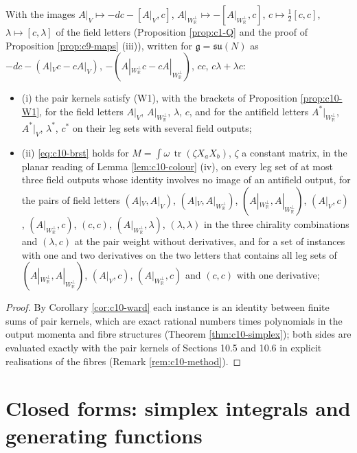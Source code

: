 \begin{proposition}
\label{prop:c10-checks}
With the images $A|_V\mapsto-dc-[A|_V,c]$, $A|_{W_{\mathbb R}^\perp}\mapsto-[A|_{W_{\mathbb R}^\perp},c]$, $c\mapsto\tfrac12[c,c]$, $\lambda\mapsto[c,\lambda]$ of the field letters (Proposition \ref{prop:c1-Q} and the proof of Proposition \ref{prop:c9-maps} (iii)), written for $\mathfrak g=\mathfrak{su}(N)$ as $-dc-(A|_Vc-cA|_V)$, $-(A|_{W_{\mathbb R}^\perp}c-cA|_{W_{\mathbb R}^\perp})$, $cc$, $c\lambda+\lambda c$:
\begin{itemize}
\item (i) the pair kernels satisfy (W1), with the brackets of Proposition \ref{prop:c10-W1}, for the field letters $A|_V$, $A|_{W_{\mathbb R}^\perp}$, $\lambda$, $c$, and for the antifield letters $A^*|_{W_{\mathbb R}^\perp}$, $A^*|_V$, $\lambda^*$, $c^*$ on their leg sets with several field outputs;
\item (ii) \eqref{eq:c10-brst} holds for $M=\int\omega\,\operatorname{tr}(\zeta X_aX_b)$, $\zeta$ a constant matrix, in the planar reading of Lemma \ref{lem:c10-colour} (iv), on every leg set of at most three field outputs whose identity involves no image of an antifield output, for the pairs of field letters $(A|_V,A|_V)$, $(A|_V,A|_{W_{\mathbb R}^\perp})$, $(A|_{W_{\mathbb R}^\perp},A|_{W_{\mathbb R}^\perp})$, $(A|_V,c)$, $(A|_{W_{\mathbb R}^\perp},c)$, $(c,c)$, $(A|_{W_{\mathbb R}^\perp},\lambda)$, $(\lambda,\lambda)$ in the three chirality combinations and $(\lambda,c)$ at the pair weight without derivatives, and for a set of instances with one and two derivatives on the two letters that contains all leg sets of $(A|_{W_{\mathbb R}^\perp},A|_{W_{\mathbb R}^\perp})$, $(A|_V,c)$, $(A|_{W_{\mathbb R}^\perp},c)$ and $(c,c)$ with one derivative;
\end{itemize}
\end{proposition}

\begin{proof}
By Corollary \ref{cor:c10-ward} each instance is an identity between finite sums of pair kernels, which are exact rational numbers times polynomials in the output momenta and fibre structures (Theorem \ref{thm:c10-simplex}); both sides are evaluated exactly with the pair kernels of Sections 10.5 and 10.6 in explicit realisations of the fibres (Remark \ref{rem:c10-method}).
\end{proof}

\section{Closed forms: simplex integrals and generating functions}

